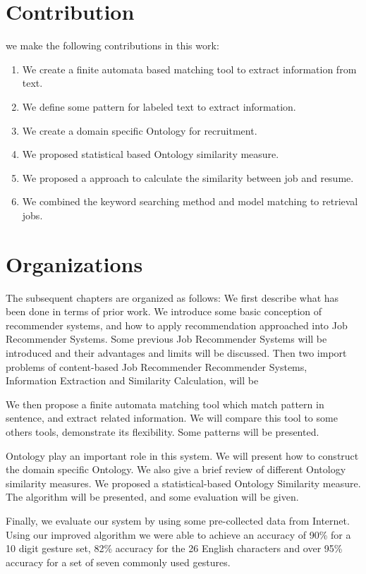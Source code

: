 \section{Contribution}

we make the following contributions in this work:

\begin{enumerate}
    \item  We create a finite automata based matching tool to extract information from text.
    \item  We define some pattern for labeled text to extract information.
    \item  We create a domain specific Ontology for recruitment.
    \item  We proposed statistical based Ontology similarity measure.
    \item  We proposed a approach to calculate the similarity between job and resume.
    \item  We combined the keyword searching method and model matching to retrieval jobs.    
\end{enumerate}

\section{Organizations}
The subsequent chapters are organized as follows: We first describe what has been done in terms of prior work.  We introduce some basic conception of recommender systems, and how to apply recommendation approached into Job Recommender Systems. Some previous Job Recommender Systems will be introduced and their advantages and limits will be discussed. Then two import problems of content-based Job Recommender Recommender Systems, Information Extraction and Similarity Calculation, will be

We then propose a finite automata matching tool which match pattern in sentence, and extract related information. We will compare this tool to some others tools, demonstrate its flexibility. Some patterns will be presented.

Ontology play an important role in this system. We will present how to construct the domain specific Ontology. We also give a brief review of different Ontology similarity measures. We proposed a statistical-based Ontology Similarity measure. The algorithm will be presented, and some evaluation will be given.

Finally, we evaluate our system by using some pre-collected data from Internet. Using our improved algorithm we were able to achieve an accuracy of 90\% for a 10 digit gesture set, 82\% accuracy for the 26 English characters and over 95\% accuracy for a set of seven commonly used gestures.
